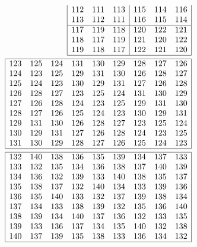 \documentclass[12pt,a4paper]{amsart}
\begin{document}
\begin{align*}
\begin{array}{|rrr|rrr|}
112&111&113&115&114&116\\%
113&112&111&116&115&114\\%
\hline
117&119&118&120&122&121\\%
118&117&119&121&120&122\\%
119&118&117&122&121&120\\%
\hline
\end{array} \\
\begin{array}{|rrrrrrrrr|}%
\hline
123&125&124&131&130&129&128&127&126\\%
124&123&125&129&131&130&126&128&127\\%
125&124&123&130&129&131&127&126&128\\%
126&128&127&123&125&124&131&130&129\\%
127&126&128&124&123&125&129&131&130\\%
128&127&126&125&124&123&130&129&131\\%
129&131&130&126&128&127&123&125&124\\%
130&129&131&127&126&128&124&123&125\\%
131&130&129&128&127&126&125&124&123\\%
\hline
\end{array} \\
\begin{array}{|rrrrrrrrr|}%
\hline
132&140&138&136&135&139&134&137&133\\%
133&132&135&134&136&138&137&140&139\\%
134&136&132&139&133&140&138&135&137\\%
135&138&137&132&140&134&133&139&136\\%
136&135&140&133&132&137&139&138&134\\%
137&134&133&138&139&132&135&136&140\\%
138&139&134&140&137&136&132&133&135\\%
139&133&136&137&134&135&140&132&138\\%
140&137&139&135&138&133&136&134&132\\%
\hline
\end{array}%
\end{align*}
\end{document}
